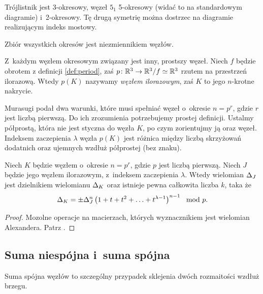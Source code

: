 Trójlistnik jest 3-okresowy, węzeł $5_1$ 5-okresowy (widać to na standardowym diagramie) i~2-okresowy.
Tę drugą symetrię można dostrzec na diagramie realizującym indeks mostowy.

\begin{proposition}
    Zbiór wszystkich okresów jest niezmiennikiem węzłów.
\end{proposition}

Z~każdym węzłem okresowym związany jest inny, prostszy węzeł.
Niech $f$ będzie obrotem z definicji \ref{def:period}, zaś $p \colon \mathbb R^3 \to \mathbb R^3/f \simeq \mathbb R^3$ rzutem na przestrzeń ilorazową.
Wtedy $p(K)$ nazywamy \emph{węzłem ilorazowym}, zaś $K$ to jego $n$-krotne nakrycie.

Murasugi podał dwa warunki, które musi spełniać węzeł o~okresie $n = p^r$, gdzie $r$ jest liczbą pierwszą.
Do ich zrozumienia potrzebujemy prostej definicji.
Ustalmy półprostą, która nie jest styczna do węzła $K$, po czym zorientujmy ją oraz węzeł.
Indeksem zaczepienia $\lambda$ węzła $p(K)$ jest różnica między liczbą skrzyżowań dodatnich oraz ujemnych wzdłuż półprostej (bez znaku).

\begin{proposition}
    \label{prp:murasugi_periodic}
    Niech $K$ będzie węzłem o~okresie $n = p^r$, gdzie $p$ jest liczbą pierwszą.
    Niech $J$ będzie jego węzłem ilorazowym, z~indeksem zaczepienia $\lambda$.
    Wtedy wielomian $\Delta_J$ jest dzielnikiem wielomianu $\Delta_K$ oraz istnieje pewna całkowita liczba $k$, taka że
    \begin{equation}
        \Delta_K = \pm \Delta_J^n \left(1 + t + t^2 + \ldots + t^{\lambda - 1}\right)^{n-1} \mod p.
    \end{equation}
\end{proposition}

\begin{proof}
    Mozolne operacje na macierzach, których wyznacznikiem jest wielomian Alexandera.
    Patrz \cite{murasugi71}.
\end{proof}


\subsection{Suma niespójna i~suma spójna} %

Suma spójna węzłów to szczególny przypadek sklejenia dwóch rozmaitości wzdłuż brzegu.

